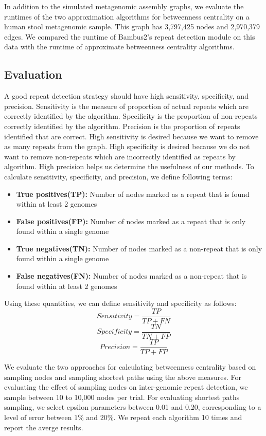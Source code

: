 \documentclass[runningheads,a4paper]{llncs}
\begin{document}
In addition to the simulated metagenomic assembly graphs, we evaluate the runtimes of the two approximation algorithms for betweenness centrality on a human stool metagenomic sample. This graph has 3,797,425 nodes and 2,970,379 edges. We compared the runtime of Bambus2's repeat detection module on this data with the runtime of approximate betweenness centrality algorithms.  

\subsection*{Evaluation}
A good repeat detection strategy should have high sensitivity, specificity, and precision. Sensitivity is the measure of proportion of actual repeats which are correctly identified by the algorithm. Specificity is the proportion of non-repeats correctly identified by the algorithm. Precision is the proportion of repeats identified that are correct. High sensitivity is desired because we want to remove as many repeats from the graph. High specificity is desired because we do not want to remove non-repeats which are incorrectly identified as repeats by algorithm. High precision helps us determine the usefulness of our methods. To calculate sensitivity, specificity, and precision, we define following terms:
\begin{itemize}
\item \textbf{True positives(TP):} Number of nodes marked as a repeat that is found within at least 2 genomes
\item \textbf{False positives(FP):} Number of nodes marked as a repeat that is only found within a single genome
\item \textbf{True negatives(TN):} Number of nodes marked as a non-repeat that is only found within a single genome
\item \textbf{False negatives(FN):} Number of nodes marked as a non-repeat that is found within at least 2 genomes
\end{itemize}

Using these quantities, we can define sensitivity and specificity as follows:
 $$Sensitivity = \frac{TP}{TP+FN}$$
 $$Specificity = \frac{TN}{TN+FP}$$
 $$Precision = \frac{TP}{TP + FP}$$

We evaluate the two approaches for calculating betweenness centrality based on sampling nodes and sampling shortest paths using the above measures.
For evaluating the effect of sampling nodes on inter-genomic repeat detection, we sample between 10 to 10,000 nodes per trial.
For evaluating shortest paths sampling, we select epsilon parameters between 0.01 and 0.20, corresponding to a level of error between $1\%$ and $20\%$.
We repeat each algorithm 10 times and report the averge results.
\end{document}
